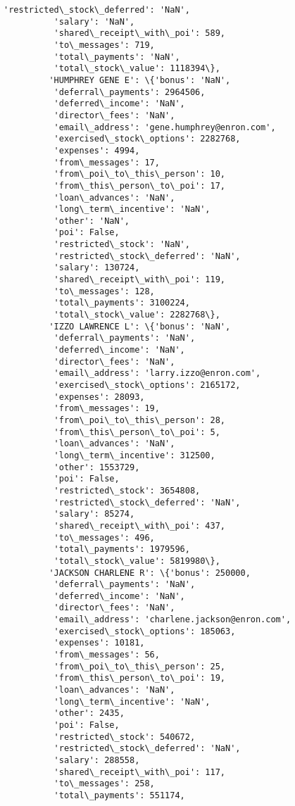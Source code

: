 \documentclass[11pt]{article}
\begin{document}
\begin{Verbatim}[commandchars=\\\{\}]
          'restricted\_stock\_deferred': 'NaN',
          'salary': 'NaN',
          'shared\_receipt\_with\_poi': 589,
          'to\_messages': 719,
          'total\_payments': 'NaN',
          'total\_stock\_value': 1118394\},
         'HUMPHREY GENE E': \{'bonus': 'NaN',
          'deferral\_payments': 2964506,
          'deferred\_income': 'NaN',
          'director\_fees': 'NaN',
          'email\_address': 'gene.humphrey@enron.com',
          'exercised\_stock\_options': 2282768,
          'expenses': 4994,
          'from\_messages': 17,
          'from\_poi\_to\_this\_person': 10,
          'from\_this\_person\_to\_poi': 17,
          'loan\_advances': 'NaN',
          'long\_term\_incentive': 'NaN',
          'other': 'NaN',
          'poi': False,
          'restricted\_stock': 'NaN',
          'restricted\_stock\_deferred': 'NaN',
          'salary': 130724,
          'shared\_receipt\_with\_poi': 119,
          'to\_messages': 128,
          'total\_payments': 3100224,
          'total\_stock\_value': 2282768\},
         'IZZO LAWRENCE L': \{'bonus': 'NaN',
          'deferral\_payments': 'NaN',
          'deferred\_income': 'NaN',
          'director\_fees': 'NaN',
          'email\_address': 'larry.izzo@enron.com',
          'exercised\_stock\_options': 2165172,
          'expenses': 28093,
          'from\_messages': 19,
          'from\_poi\_to\_this\_person': 28,
          'from\_this\_person\_to\_poi': 5,
          'loan\_advances': 'NaN',
          'long\_term\_incentive': 312500,
          'other': 1553729,
          'poi': False,
          'restricted\_stock': 3654808,
          'restricted\_stock\_deferred': 'NaN',
          'salary': 85274,
          'shared\_receipt\_with\_poi': 437,
          'to\_messages': 496,
          'total\_payments': 1979596,
          'total\_stock\_value': 5819980\},
         'JACKSON CHARLENE R': \{'bonus': 250000,
          'deferral\_payments': 'NaN',
          'deferred\_income': 'NaN',
          'director\_fees': 'NaN',
          'email\_address': 'charlene.jackson@enron.com',
          'exercised\_stock\_options': 185063,
          'expenses': 10181,
          'from\_messages': 56,
          'from\_poi\_to\_this\_person': 25,
          'from\_this\_person\_to\_poi': 19,
          'loan\_advances': 'NaN',
          'long\_term\_incentive': 'NaN',
          'other': 2435,
          'poi': False,
          'restricted\_stock': 540672,
          'restricted\_stock\_deferred': 'NaN',
          'salary': 288558,
          'shared\_receipt\_with\_poi': 117,
          'to\_messages': 258,
          'total\_payments': 551174,

\end{Verbatim}
\end{document}
